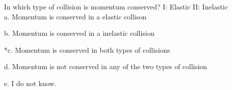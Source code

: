 
In which type of collision is momentum conserved?
I: Elastic
II: Inelastic\\

a. Momentum is conserved in a elastic collison

b. Momentum is conserved in a inelastic collision

*c. Momentum is conserved in both types of collisions

d. Momentum is not conserved in any of the two types of collision

e. I do not know.\\ 
